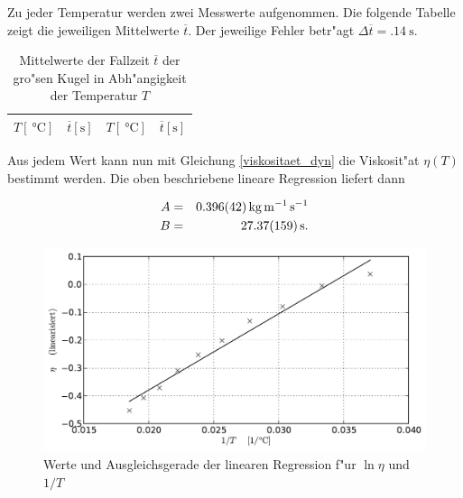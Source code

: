 		Zu jeder Temperatur werden zwei Messwerte aufgenommen. Die folgende Tabelle zeigt die jeweiligen Mittelwerte $\overline{t}$. Der jeweilige Fehler betr"agt $\Delta \overline{t} = \SI{.14}{\second}$.

		\begin{table}[h!]
			\centering
			\caption{Mittelwerte der Fallzeit $\overline{t}$ der gro"sen Kugel in Abh"angigkeit der Temperatur $T$}
			\begin{tabular}{|c|c||c|c|}
				\hline
				$T [\SI{}{\celsius}]$ & $\overline{t} [\mathrm{s}]$ & $T [\SI{}{\celsius}]$ & $\overline{t} [\mathrm{s}]$ \\
				\hline
				\hline
				
				\hline
			\end{tabular}
		\end{table}

		Aus jedem Wert kann nun mit Gleichung \eqref{viskositaet_dyn} die Viskosit"at $\eta (T)$ bestimmt werden.
		Die oben beschriebene lineare Regression liefert dann

		\begin{eqnarray*}
			A & = & \SI{.396 (42)}{\kilo \gram \per \meter \per \second} \\
			B & = & \SI{27.37 (159)}{\second} .
		\end{eqnarray*}

		\begin{figure}[h!]
			\centering
			\includegraphics[width = 15cm]{img/plot.pdf}
			\caption{Werte und Ausgleichsgerade der linearen Regression f"ur $\ln{\eta}$ und $1 / T$}
			\label{fig:regression}
		\end{figure}

